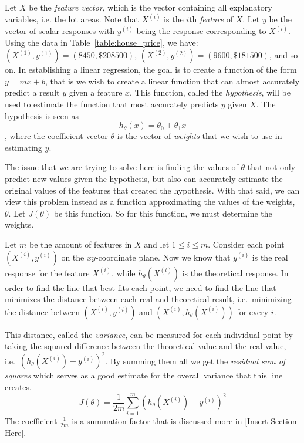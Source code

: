 \documentclass{book}[a5paper]
\newcommand{\placeholder}{[Insert Section Here]}
\begin{document}
Let $X$ be the \emph{feature vector}, which is the vector containing all
explanatory variables, i.e. the lot areas. Note that $X^{(i)}$ is the $i$th \emph{feature} of $X$.
Let $y$ be the vector of scalar responses with $y^{(i)}$ being the response corresponding to $X^{(i)}$. Using the data in Table~\ref{table:house_price}, we have: $(X^{(1)}, y^{(1)}) = (8450, \$208500)$, $(X^{(2)}, y^{(2)}) = (9600, \$181500)$, and so on. In establishing a linear regression, the
goal is to create a function of the form $y=mx+b$, that is we wish to create a
linear function that can almost accurately predict a result $y$ given a feature
$x$. This function, called the \emph{hypothesis}, will be used to estimate the
function that most accurately predicts $y$ given $X$. The hypothesis is seen as
\begin{equation}
    h_{\theta}(x) = \theta_0 + \theta_1x
\end{equation}
, where the coefficient vector $\theta$ is the vector of \emph{weights} that we
wish to use in estimating $y$.

The issue that we are trying to solve here is finding the values of ${\theta}$
that not only predict new values given the hypothesis, but also can accurately
estimate the original values of the features that created the hypothesis. With
that said, we can view this problem instead as a function approximating the
values of the weights, $\theta$. Let $J(\theta)$ be this function. So for this
function, we must determine the weights.

Let $m$ be the amount of features in $X$ and let $1 \leq i \leq m$. Consider
each point $(X^{(i)}, y^{(i)})$ on the $xy$-coordinate plane. Now we know that
$y^{(i)}$ is the real response for the feature $X^{(i)}$, while
$h_{\theta}(X^{(i)})$ is the theoretical response. In order to find the line
that best fits each point, we need to find the line that minimizes the distance
between each real and theoretical result, i.e.\ minimizing the distance between
$(X^{(i)}, y^{(i)})$ and $(X^{(i)}, h_{\theta}(X^{(i)}))$ for every $i$.

This distance, called the \emph{variance}, can be measured for each individual
point by taking the squared difference between the theoretical value and the
real value, i.e.\  $(h_{\theta}(X^{(i)}) - y^{(i)})^2$. By summing them all we
get the \emph{residual sum of squares} which serves as a good estimate for the
overall variance that this line creates.
\begin{equation}
	J(\theta) = \frac{1}{2m}\sum_{i=1}^m(h_{\theta}(X^{(i)}) - y^{(i)})^2
\end{equation}
The coefficient $\frac{1}{2m}$ is a summation factor that is discussed more in \placeholder.
\end{document}
